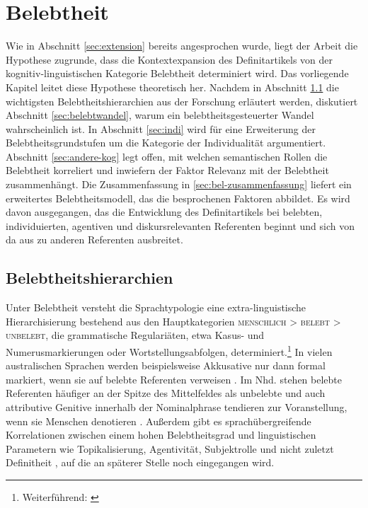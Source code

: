 \chapter{Belebtheit} \label{chapter:belebtheit}

Wie in Abschnitt \ref{sec:extension} bereits angesprochen wurde, liegt der Arbeit  die Hypothese zugrunde, dass die Kontextexpansion des Definitartikels von der kognitiv-linguistischen Kategorie Belebtheit determiniert wird. Das vorliegende Kapitel leitet diese Hypothese theoretisch her. Nachdem in Abschnitt \ref{sec:belebt} die wichtigsten Belebtheitshierarchien aus der Forschung erläutert werden, diskutiert Abschnitt \ref{sec:belebtwandel}, warum ein belebtheitsgesteuerter Wandel wahrscheinlich ist. In Abschnitt \ref{sec:indi} wird für eine Erweiterung der Belebtheitsgrundstufen um die Kategorie der Individualität argumentiert. Abschnitt \ref{sec:andere-kog} legt offen, mit welchen semantischen Rollen die Belebtheit korreliert und inwiefern der Faktor Relevanz mit der Belebtheit zusammenhängt. Die Zusammenfassung in \ref{sec:bel-zusammenfassung} liefert ein erweitertes Belebtheitsmodell, das die besprochenen Faktoren abbildet. Es wird davon ausgegangen, das die Entwicklung des Definitartikels bei belebten, individuierten, agentiven und diskursrelevanten Referenten beginnt und sich von da aus zu anderen Referenten ausbreitet. 

\section{Belebtheitshierarchien}\label{sec:belebt}

Unter Belebtheit versteht die Sprachtypologie eine extra-linguistische Hierarchisierung bestehend aus den Hauptkategorien \textsc{menschlich > belebt > unbelebt}, die grammatische Regulariäten, etwa Kasus- und Numerusmarkierungen oder Wortstellungsabfolgen, determiniert.\footnote{Weiterführend:  \textcite{Silverstein1976,Allan1987,Comrie1989,Langacker1991,Dahl1996,Yamamoto1999,Yamamoto2006,Croft1995,Croft2006,Dixon1995, Corbett2000,Aissen2003,Zifonun2006, Dahl2008}} In vielen australischen Sprachen werden beispielsweise Akkusative nur dann formal markiert, wenn sie auf belebte Referenten verweisen \parencite[189]{Comrie1989}. 
Im Nhd. stehen belebte Referenten häufiger an der Spitze des Mittelfeldes als unbelebte \parencite{Kempen2004} und auch attributive Genitive innerhalb der Nominalphrase tendieren zur Voranstellung, wenn sie Menschen denotieren  \parencite{Hartmann2003}. Außerdem gibt es sprachübergreifende Korrelationen zwischen einem hohen Belebtheitsgrad und linguistischen Parametern wie Topikalisierung, Agentivität, Subjektrolle und nicht zuletzt Definitheit \parencite{Comrie1989, Yamamoto2006}, auf die an späterer Stelle noch eingegangen wird. 

